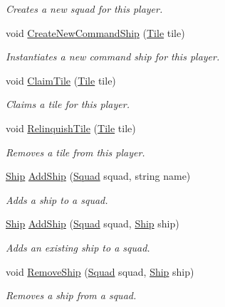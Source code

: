 \begin{DoxyCompactItemize}
\begin{DoxyCompactList}\small\item\em Creates a new squad for this player. \end{DoxyCompactList}\item 
void \hyperlink{class_player_af4b0c200bf3e862398acd008c68a6778}{Create\+New\+Command\+Ship} (\hyperlink{class_tile}{Tile} tile)
\begin{DoxyCompactList}\small\item\em Instantiates a new command ship for this player. \end{DoxyCompactList}\item 
void \hyperlink{class_player_aeb685561ebc33646e84dbc69170270e4}{Claim\+Tile} (\hyperlink{class_tile}{Tile} tile)
\begin{DoxyCompactList}\small\item\em Claims a tile for this player. \end{DoxyCompactList}\item 
void \hyperlink{class_player_ad20ccbfecd961e98d8c9dd4d41a8bcbc}{Relinquish\+Tile} (\hyperlink{class_tile}{Tile} tile)
\begin{DoxyCompactList}\small\item\em Removes a tile from this player. \end{DoxyCompactList}\item 
\hyperlink{class_ship}{Ship} \hyperlink{class_player_a8445439fb78ea72b4a33f18b6025955a}{Add\+Ship} (\hyperlink{class_squad}{Squad} squad, string name)
\begin{DoxyCompactList}\small\item\em Adds a ship to a squad. \end{DoxyCompactList}\item 
\hyperlink{class_ship}{Ship} \hyperlink{class_player_a9a12c76a22e895704af3fdd60780df29}{Add\+Ship} (\hyperlink{class_squad}{Squad} squad, \hyperlink{class_ship}{Ship} ship)
\begin{DoxyCompactList}\small\item\em Adds an existing ship to a squad. \end{DoxyCompactList}\item 
void \hyperlink{class_player_a7f173a71c04d605af9962e66d8f13b31}{Remove\+Ship} (\hyperlink{class_squad}{Squad} squad, \hyperlink{class_ship}{Ship} ship)
\begin{DoxyCompactList}\small\item\em Removes a ship from a squad. \end{DoxyCompactList}\item 

\end{DoxyCompactItemize}
